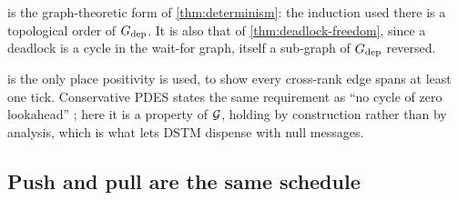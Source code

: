  is the graph-theoretic form of \cref{thm:determinism}: the
induction used there is a topological order of $G_{\mathrm{dep}}$. It is also that of
\cref{thm:deadlock-freedom}, since a deadlock is a cycle in the wait-for
graph, itself a sub-graph of $G_{\mathrm{dep}}$ reversed.

\begin{remark}\label{rem:chandy-misra}
 is the only place positivity is used, to show every
cross-rank edge spans at least one tick. Conservative PDES states the same
requirement as ``no cycle of zero lookahead'' \cite{chandy1979}; here it is a
property of $\mathcal{G}$, holding by construction rather than by analysis, which
is what lets DSTM dispense with null messages.
\end{remark}

\subsection{Push and pull are the same schedule}
\label{sec:sync-duality}

